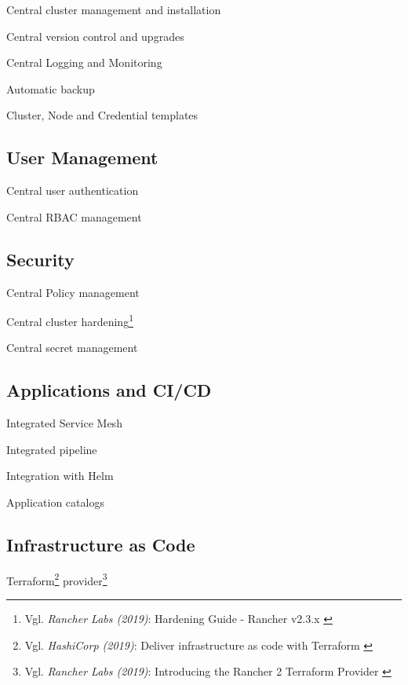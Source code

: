 Central cluster management and installation

Central version control and upgrades

Central Logging and Monitoring

Automatic backup 

Cluster, Node and Credential templates

\subsection{User Management}

Central user authentication

Central RBAC management

\subsection{Security}

Central Policy management

Central cluster hardening\footnote{Vgl. \textit{Rancher Labs (2019)}: Hardening Guide - Rancher v2.3.x \cite{hardeningGuide}}

Central secret management

\subsection{Applications and CI/CD}

Integrated Service Mesh

Integrated pipeline

Integration with Helm

Application catalogs

\subsection{Infrastructure as Code}

Terraform\footnote{Vgl. \textit{HashiCorp (2019)}: Deliver infrastructure as code with Terraform \cite{terraform}} provider\footnote{Vgl. \textit{Rancher Labs (2019)}: Introducing the Rancher 2 Terraform Provider \cite{terraformProvider}}
